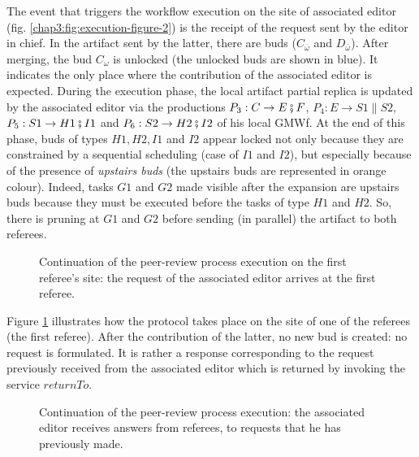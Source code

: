 The event that triggers the workflow execution on the site of associated editor (fig. \ref{chap3:fig:execution-figure-2}) is the receipt of the request sent by the editor in chief.
In the artifact sent by the latter, there are buds ($C_{\overline{\omega}}$ and $D_{\overline{\omega}}$).
After merging, the bud $C_{\omega}$ is unlocked (the unlocked buds are shown in blue). It indicates the only place where the contribution of the associated editor is expected.
During the execution phase, the local artifact partial replica is updated by the associated editor via the productions $P_{3}: C\rightarrow E\fatsemi F$, $P_{4}: E\rightarrow S1\parallel S2$, $P_{5}: S1\rightarrow H1\fatsemi I1$ and $P_{6}: S2\rightarrow H2\fatsemi I2$ of his local GMWf. 
At the end of this phase, buds of types $H1, H2, I1$ and $I2$ appear locked not only because they are constrained by a sequential scheduling (case of $I1$ and $I2$), but especially because of the presence of \textit{upstairs buds} (the upstairs buds are represented in orange colour).
Indeed, tasks $G1$ and $G2$ made visible after the expansion are upstairs buds because they must be executed before the tasks of type $H1$ and $H2$. So, there is pruning at $G1$ and $G2$ before sending (in parallel) the artifact to both referees.
\begin{figure}[ht!]
	\noindent
	\caption{Continuation of the peer-review process execution on the first referee's site: the request of the associated editor arrives at the first referee.}
	\label{chap3:fig:execution-figure-3}
\end{figure}

Figure \ref{chap3:fig:execution-figure-3} illustrates how the protocol takes place on the site of one of the referees (the first referee). After the contribution of the latter, no new bud is created: no request is formulated. It is rather a response corresponding to the request previously received from the associated editor which is returned by invoking the service $returnTo$.
\begin{figure}[ht!]
	\noindent
	\caption{Continuation of the peer-review process execution: the associated editor receives answers from referees, to requests that he has previously made.}
	\label{chap3:fig:execution-figure-4}
\end{figure}

